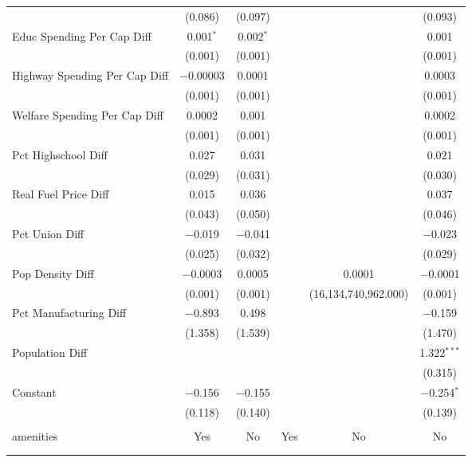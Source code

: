 \begin{table}[!htbp]
\begin{tabular}{@{\extracolsep{5pt}}lccccc}
  & (0.086) & (0.097) &  &  & (0.093) \\ 
  Educ Spending Per Cap Diff & 0.001$^{*}$ & 0.002$^{*}$ &  &  & 0.001 \\ 
  & (0.001) & (0.001) &  &  & (0.001) \\ 
  Highway Spending Per Cap Diff & $-$0.00003 & 0.0001 &  &  & 0.0003 \\ 
  & (0.001) & (0.001) &  &  & (0.001) \\ 
  Welfare Spending Per Cap Diff & 0.0002 & 0.001 &  &  & 0.0002 \\ 
  & (0.001) & (0.001) &  &  & (0.001) \\ 
  Pct Highschool Diff & 0.027 & 0.031 &  &  & 0.021 \\ 
  & (0.029) & (0.031) &  &  & (0.030) \\ 
  Real Fuel Price Diff & 0.015 & 0.036 &  &  & 0.037 \\ 
  & (0.043) & (0.050) &  &  & (0.046) \\ 
  Pct Union Diff & $-$0.019 & $-$0.041 &  &  & $-$0.023 \\ 
  & (0.025) & (0.032) &  &  & (0.029) \\ 
  Pop Density Diff & $-$0.0003 & 0.0005 &  & 0.0001 & $-$0.0001 \\ 
  & (0.001) & (0.001) &  & (16,134,740,962.000) & (0.001) \\ 
  Pct Manufacturing Diff & $-$0.893 & 0.498 &  &  & $-$0.159 \\ 
  & (1.358) & (1.539) &  &  & (1.470) \\ 
  Population Diff &  &  &  &  & 1.322$^{***}$ \\ 
  &  &  &  &  & (0.315) \\ 
  Constant & $-$0.156 & $-$0.155 &  &  & $-$0.254$^{*}$ \\ 
  & (0.118) & (0.140) &  &  & (0.139) \\ 
 \hline \\[-1.8ex] 
amenities & Yes & No & Yes & No & No \\ 
\hline \\[-1.8ex] 
\hline 
\hline \\[-1.8ex] 
\end{tabular} 
\end{table} 
